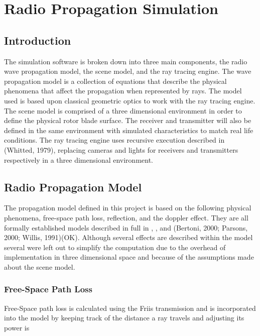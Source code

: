 \chapter{Radio Propagation Simulation} \label{ch:radio_propagation}

\section{Introduction}
The simulation software is broken down into three main components, the radio wave propagation model, the scene model, and the ray tracing engine. The wave propagation model is a collection of equations that describe the physical phenomena that affect the propagation when represented by rays. The model used is based upon classical geometric optics to work with the ray tracing engine. The scene model is comprised of a three dimensional environment in order to define the physical rotor blade surface. The receiver and transmitter will also be defined in the same environment with simulated characteristics to match real life conditions. The ray tracing engine uses recursive execution described in \cite{Whitted1979}(Whitted, 1979), replacing cameras and lights for receivers and transmitters respectively in a three dimensional environment.

\section{Radio Propagation Model}
The propagation model defined in this project is based on the following physical phenomena, free-space path loss, reflection, and the doppler effect. They are all formally established models described in full in \cite{Bertoni1999}, \cite{Parsons2000}, and \cite{Willis2005} (Bertoni, 2000; Parsons, 2000; Willis, 1991)(OK). Although several effects are described within the model several were left out to simplify the computation due to the overhead of implementation in three dimensional space and because of the assumptions made about the scene model.

\subsection{Free-Space Path Loss}
Free-Space path loss is calculated using the Friis transmission and is incorporated into the model by keeping track of the distance a ray travels and adjusting its power is

